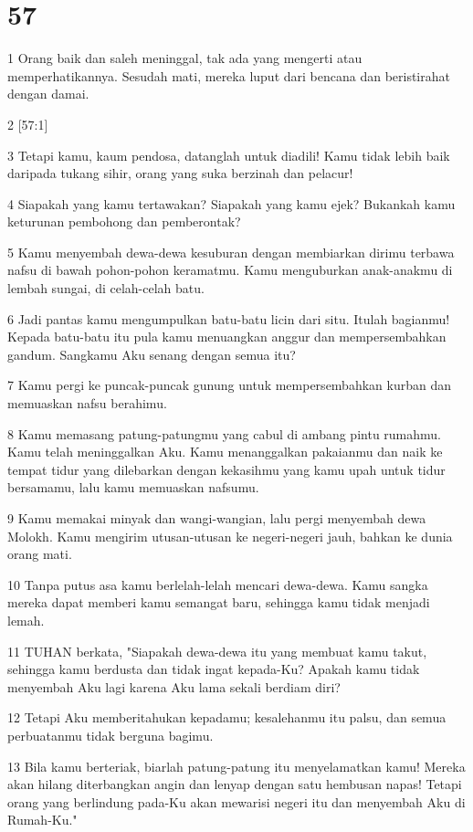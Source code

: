\chapter{57}

\par 1 Orang baik dan saleh meninggal, tak ada yang mengerti atau memperhatikannya. Sesudah mati, mereka luput dari bencana dan beristirahat dengan damai.
\par 2 [57:1]
\par 3 Tetapi kamu, kaum pendosa, datanglah untuk diadili! Kamu tidak lebih baik daripada tukang sihir, orang yang suka berzinah dan pelacur!
\par 4 Siapakah yang kamu tertawakan? Siapakah yang kamu ejek? Bukankah kamu keturunan pembohong dan pemberontak?
\par 5 Kamu menyembah dewa-dewa kesuburan dengan membiarkan dirimu terbawa nafsu di bawah pohon-pohon keramatmu. Kamu menguburkan anak-anakmu di lembah sungai, di celah-celah batu.
\par 6 Jadi pantas kamu mengumpulkan batu-batu licin dari situ. Itulah bagianmu! Kepada batu-batu itu pula kamu menuangkan anggur dan mempersembahkan gandum. Sangkamu Aku senang dengan semua itu?
\par 7 Kamu pergi ke puncak-puncak gunung untuk mempersembahkan kurban dan memuaskan nafsu berahimu.
\par 8 Kamu memasang patung-patungmu yang cabul di ambang pintu rumahmu. Kamu telah meninggalkan Aku. Kamu menanggalkan pakaianmu dan naik ke tempat tidur yang dilebarkan dengan kekasihmu yang kamu upah untuk tidur bersamamu, lalu kamu memuaskan nafsumu.
\par 9 Kamu memakai minyak dan wangi-wangian, lalu pergi menyembah dewa Molokh. Kamu mengirim utusan-utusan ke negeri-negeri jauh, bahkan ke dunia orang mati.
\par 10 Tanpa putus asa kamu berlelah-lelah mencari dewa-dewa. Kamu sangka mereka dapat memberi kamu semangat baru, sehingga kamu tidak menjadi lemah.
\par 11 TUHAN berkata, "Siapakah dewa-dewa itu yang membuat kamu takut, sehingga kamu berdusta dan tidak ingat kepada-Ku? Apakah kamu tidak menyembah Aku lagi karena Aku lama sekali berdiam diri?
\par 12 Tetapi Aku memberitahukan kepadamu; kesalehanmu itu palsu, dan semua perbuatanmu tidak berguna bagimu.
\par 13 Bila kamu berteriak, biarlah patung-patung itu menyelamatkan kamu! Mereka akan hilang diterbangkan angin dan lenyap dengan satu hembusan napas! Tetapi orang yang berlindung pada-Ku akan mewarisi negeri itu dan menyembah Aku di Rumah-Ku."
